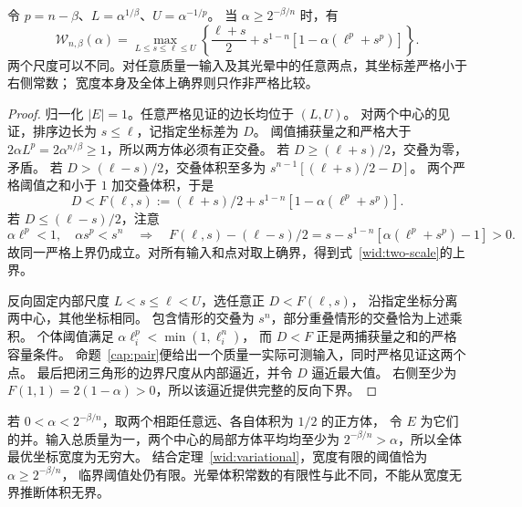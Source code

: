 \begin{theorem}[全体宽度的精确二尺度公式]\label{wid:variational}
令 $p=n-\beta$、$L=\alpha^{1/\beta}$、$U=\alpha^{-1/p}$。
当 $\alpha\ge2^{-\beta/n}$ 时，有
\begin{equation}\label{wid:two-scale}
 \mathcal W_{n,\beta}(\alpha)
 =\max_{L\le s\le\ell\le U}
 \left\{\frac{\ell+s}{2}
 +s^{1-n}[1-\alpha(\ell^p+s^p)]\right\}.
\end{equation}
两个尺度可以不同。对任意质量一输入及其光晕中的任意两点，其坐标差严格小于右侧常数；
宽度本身及全体上确界则只作非严格比较。
\end{theorem}
\begin{proof}
归一化 $|E|=1$。任意严格见证的边长均位于 $(L,U)$。
对两个中心的见证，排序边长为 $s\le\ell$，记指定坐标差为 $D$。
阈值捕获量之和严格大于
$2\alpha L^p=2\alpha^{n/\beta}\ge1$，所以两方体必须有正交叠。
若 $D\ge(\ell+s)/2$，交叠为零，矛盾。
若 $D>(\ell-s)/2$，交叠体积至多为
$s^{n-1}[(\ell+s)/2-D]$。
两个严格阈值之和小于 $1$ 加交叠体积，于是
\[
 D<F(\ell,s):=(\ell+s)/2+s^{1-n}[1-\alpha(\ell^p+s^p)].
\]
若 $D\le(\ell-s)/2$，注意
\[
 \alpha\ell^p<1,\quad \alpha s^p<s^n
 \quad\Longrightarrow\quad
 F(\ell,s)-(\ell-s)/2
 =s-s^{1-n}[\alpha(\ell^p+s^p)-1]>0.
\]
故同一严格上界仍成立。对所有输入和点对取上确界，得到式~\eqref{wid:two-scale}的上界。

反向固定内部尺度 $L<s\le\ell<U$，选任意正 $D<F(\ell,s)$，
沿指定坐标分离两中心，其他坐标相同。
包含情形的交叠为 $s^n$，部分重叠情形的交叠恰为上述乘积。
个体阈值满足 $\alpha\ell_i^p<\min(1,\ell_i^n)$，
而 $D<F$ 正是两捕获量之和的严格容量条件。
命题~\ref{cap:pair}便给出一个质量一实际可测输入，同时严格见证这两个点。
最后把闭三角形的边界尺度从内部逼近，并令 $D$ 逼近最大值。
右侧至少为 $F(1,1)=2(1-\alpha)>0$，所以该逼近提供完整的反向下界。
\end{proof}

\begin{example}[宽度有限性的精确阈值]\label{wid:infinite}
若 $0<\alpha<2^{-\beta/n}$，取两个相距任意远、各自体积为 $1/2$ 的正方体，
令 $E$ 为它们的并。输入总质量为一，两个中心的局部方体平均均至少为
$2^{-\beta/n}>\alpha$，所以全体最优坐标宽度为无穷大。
结合定理~\ref{wid:variational}，宽度有限的阈值恰为 $\alpha\ge2^{-\beta/n}$，
临界阈值处仍有限。光晕体积常数的有限性与此不同，不能从宽度无界推断体积无界。
\end{example}

